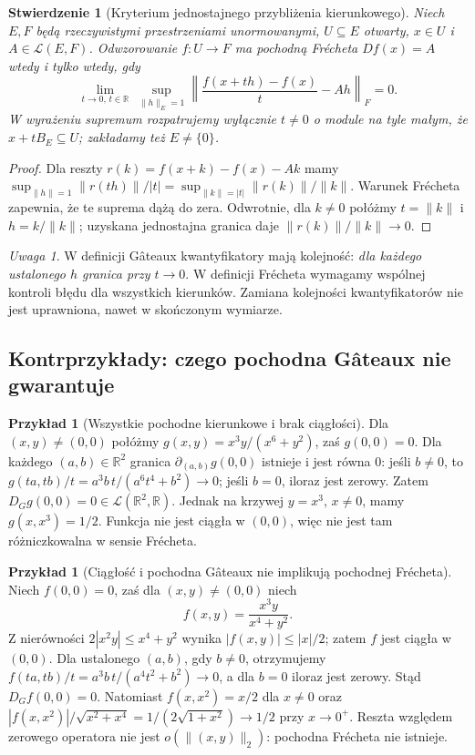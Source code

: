 \documentclass[11pt,a4paper]{article}
\numberwithin{equation}{section}
\theoremstyle{plain}
\newtheorem{stwierdzenie}[twierdzenie]{Stwierdzenie}
\theoremstyle{definition}
\newtheorem{przyklad}[twierdzenie]{Przykład}
\theoremstyle{remark}
\newtheorem{uwaga}[twierdzenie]{Uwaga}
\newcommand{\R}{\mathbb R}
\begin{document}
\begin{stwierdzenie}[Kryterium jednostajnego przybliżenia kierunkowego]
\label{prop:uniform-directions14}
Niech $E,F$ będą rzeczywistymi przestrzeniami unormowanymi, $U\subseteq E$ otwarty, $x\in U$ i $A\in\mathcal L(E,F)$. Odwzorowanie $f:U\to F$ ma pochodną Frécheta $Df(x)=A$ wtedy i tylko wtedy, gdy
\[
\lim_{t\to0,\,t\in\R}\ \sup_{\|h\|_E=1}
\left\|\frac{f(x+th)-f(x)}{t}-Ah\right\|_F=0.
\]
W wyrażeniu supremum rozpatrujemy wyłącznie $t\ne0$ o module na tyle małym, że $x+tB_E\subseteq U$; zakładamy też $E\ne\{0\}$.
\end{stwierdzenie}
\begin{proof}
Dla reszty $r(k)=f(x+k)-f(x)-Ak$ mamy
$\sup_{\|h\|=1}\|r(th)\|/|t|=\sup_{\|k\|=|t|}\|r(k)\|/\|k\|$.
Warunek Frécheta zapewnia, że te suprema dążą do zera. Odwrotnie, dla $k\ne0$ połóżmy $t=\|k\|$ i $h=k/\|k\|$; uzyskana jednostajna granica daje $\|r(k)\|/\|k\|\to0$.
\end{proof}

\begin{uwaga}
\label{rem:quantifiers14}
W definicji Gâteaux kwantyfikatory mają kolejność: \emph{dla każdego ustalonego $h$ granica przy $t\to0$}. W definicji Frécheta wymagamy wspólnej kontroli błędu dla wszystkich kierunków. Zamiana kolejności kwantyfikatorów nie jest uprawniona, nawet w skończonym wymiarze.
\end{uwaga}

\subsection{Kontrprzykłady: czego pochodna Gâteaux nie gwarantuje}

\begin{przyklad}[Wszystkie pochodne kierunkowe i brak ciągłości]
\label{ex:directional-discontinuous14}
Dla $(x,y)\ne(0,0)$ połóżmy
$g(x,y)=x^3y/(x^6+y^2)$, zaś $g(0,0)=0$. Dla każdego $(a,b)\in\R^2$ granica $\partial_{(a,b)}g(0,0)$ istnieje i jest równa $0$: jeśli $b\ne0$, to $g(ta,tb)/t=a^3b\,t/(a^6t^4+b^2)\to0$; jeśli $b=0$, iloraz jest zerowy. Zatem $D_Gg(0,0)=0\in\mathcal L(\R^2,\R)$. Jednak na krzywej $y=x^3$, $x\ne0$, mamy $g(x,x^3)=1/2$. Funkcja nie jest ciągła w $(0,0)$, więc nie jest tam różniczkowalna w sensie Frécheta.
\end{przyklad}

\begin{przyklad}[Ciągłość i pochodna Gâteaux nie implikują pochodnej Frécheta]
\label{ex:continuous-gateaux-not-frechet14}
Niech $f(0,0)=0$, zaś dla $(x,y)\ne(0,0)$ niech
\[
f(x,y)=\frac{x^3y}{x^4+y^2}.
\]
Z nierówności $2|x^2y|\le x^4+y^2$ wynika $|f(x,y)|\le|x|/2$; zatem $f$ jest ciągła w $(0,0)$. Dla ustalonego $(a,b)$, gdy $b\ne0$, otrzymujemy
$f(ta,tb)/t=a^3b\,t/(a^4t^2+b^2)\to0$, a dla $b=0$ iloraz jest zerowy. Stąd $D_Gf(0,0)=0$. Natomiast $f(x,x^2)=x/2$ dla $x\ne0$ oraz
$|f(x,x^2)|/\sqrt{x^2+x^4}=1/(2\sqrt{1+x^2})\to1/2$ przy $x\to0^+$. Reszta względem zerowego operatora nie jest $o(\|(x,y)\|_2)$: pochodna Frécheta nie istnieje.
\end{przyklad}
\end{document}
